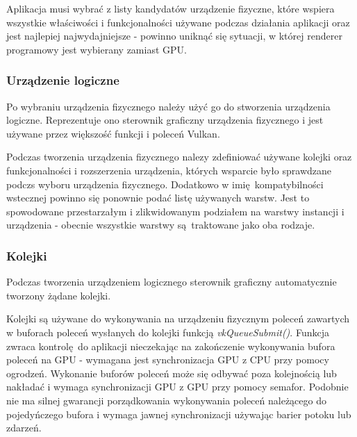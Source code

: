 Aplikacja musi wybrać z listy kandydatów urządzenie fizyczne, które wspiera wszystkie właściwości i funkcjonalności używane podczas działania aplikacji oraz jest najlepiej najwydajniejsze - powinno uniknąć się sytuacji, w której renderer programowy jest wybierany zamiast GPU.


\subsubsection{Urządzenie logiczne}

Po wybraniu urządzenia fizycznego należy użyć go do stworzenia urządzenia logiczne. Reprezentuje ono
sterownik graficzny urządzenia fizycznego i jest używane przez większość funkcji i poleceń Vulkan.

Podczas tworzenia urządzenia fizycznego nalezy zdefiniować używane kolejki oraz funkcjonalności i rozszerzenia urządzenia, których wsparcie było sprawdzane podczs wyboru urządzenia fizycznego.
Dodatkowo w imię kompatybilności wstecznej powinno się ponownie podać listę używanych warstw. Jest to spowodowane przestarzałym i zlikwidowanym podziałem na warstwy instancji i urządzenia - obecnie wszystkie warstwy są traktowane jako oba rodzaje.


\subsubsection{Kolejki}

Podczas tworzenia urządzeniem logicznego sterownik graficzny automatycznie tworzony żądane kolejki.

Kolejki są używane do wykonywania na urządzeniu fizycznym poleceń zawartych w buforach poleceń wysłanych do kolejki funkcją \textit{vkQueueSubmit()}. Funkcja zwraca kontrolę do aplikacji nieczekając na zakończenie wykonywania bufora poleceń na GPU - wymagana jest synchronizacja GPU z CPU przy pomocy ogrodzeń.
Wykonanie buforów poleceń może się odbywać poza kolejnością lub nakładać i wymaga synchronizacji GPU z GPU przy pomocy semafor.
Podobnie nie ma silnej gwarancji porządkowania wykonywania poleceń należącego do pojedyńczego bufora i wymaga jawnej synchronizacji używając barier potoku lub zdarzeń.

